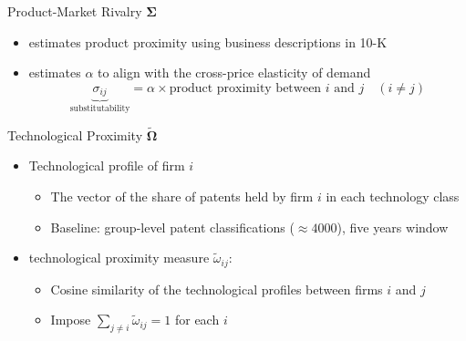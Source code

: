 \documentclass[
  10pt,
  aspectratio=169,   %
]{beamer}
\theoremstyle{plain}
\begin{document}
\begin{frame}{Product-Market Rivalry $\bm{\Sigma}$}

  \begin{itemize}
    \item \label{product_identification} \citet{Hoberg2016-jm} estimates product proximity using business descriptions in 10-K
          \medskip{}
    \item \citet{Pellegrino2024-dn} estimates $\alpha$ to align with the cross-price
          elasticity of demand
          \medskip{}
          \[
            \underbrace{\sigma_{ij}}_{\text{substitutability}}=\alpha\times\text{product proximity between }i\text{ and }j\quad\left(i\neq j\right)
          \]\hyperlink{micro_vs_ghl}{}
  \end{itemize}

\end{frame}

\begin{frame}{Technological Proximity $\widetilde{\bm{\Omega}}$}
  \begin{itemize}
    \item Technological profile of firm $i$
          \begin{itemize}
            \item The vector of the share of patents held by firm $i$ in each technology class
            \item Baseline: group-level patent classifications ($\approx 4000$), five years window
          \end{itemize}
          \medskip{} \pause
    \item \citet{Jaffe1986-yz} technological proximity measure $\tilde{\omega}_{ij}$:
          \begin{itemize}
            \item Cosine similarity of the technological profiles between firms $i$ and $j$
            \item Impose $\sum_{j\neq i}\tilde{\omega}_{ij} = 1$ for each $i$
          \end{itemize}
  \end{itemize}
\end{frame}
\end{document}
